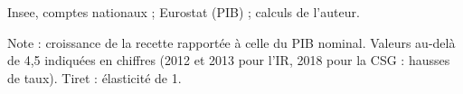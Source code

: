 Insee, comptes nationaux ; Eurostat (PIB) ; calculs de l'auteur.\par Note : croissance de la recette rapportée à celle du PIB nominal. Valeurs au-delà de 4,5 indiquées en chiffres (2012 et 2013 pour l'IR, 2018 pour la CSG : hausses de taux). Tiret : élasticité de 1.
